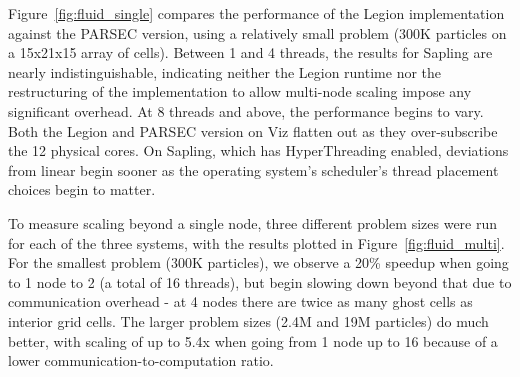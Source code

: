 Figure~\ref{fig:fluid_single} compares the performance of the Legion implementation against the PARSEC version,
using a relatively small problem (300K particles on a 15x21x15 array of cells).  Between 1 and 4 threads, the
results for Sapling are nearly indistinguishable, indicating 
neither the Legion runtime nor the restructuring of the implementation to allow multi-node scaling impose
any significant overhead.  
At 8 threads and above, the performance begins to vary.
Both the Legion and PARSEC version on Viz flatten out as they over-subscribe the 12 physical cores.  On Sapling,
which has HyperThreading enabled, deviations from linear begin sooner as the operating system's scheduler's
thread placement choices begin to matter.

To measure scaling beyond a single node, three different problem sizes were run for each of the three systems,
 with the results plotted in Figure~\ref{fig:fluid_multi}.  
 For the smallest problem (300K particles), we observe a 20\% speedup when going to 1
node to 2 (a total of 16 threads), but begin slowing down beyond that due to communication overhead - at 4 nodes
there are twice as many ghost cells as interior grid cells.  The larger problem sizes (2.4M and 19M
particles) do much better, with scaling of up to 5.4x when going from 1 node up to 16 because of a lower 
communication-to-computation ratio.


